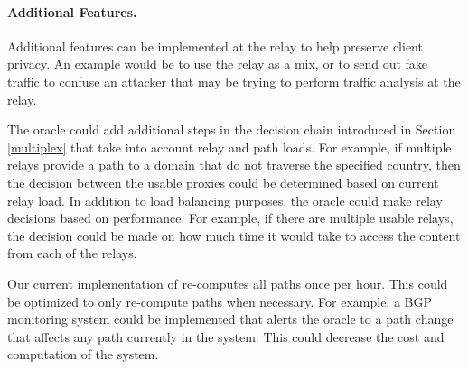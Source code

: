 \paragraph{Additional \system{} Features.}  Additional features can be 
implemented at the relay to help preserve client privacy.  An example would 
be to use the relay as a mix, or to send out fake traffic to confuse an 
attacker that may be trying to perform traffic analysis at the relay.

The oracle could add additional 
steps in the decision chain introduced in Section \ref{multiplex} that take 
into account relay and path loads.  For example, if multiple relays provide 
a path to a domain that do not traverse the specified country, then the 
decision between the usable proxies could be determined based on current relay 
load.  In addition to load balancing purposes, the oracle 
could make relay decisions based on performance.  For example, if there are 
multiple usable relays, the decision could be made on how much time it would 
take to access the content from each of the relays.

Our current implementation of \system{} 
re-computes all paths once per hour.  This could be optimized to only re-compute 
paths when necessary.  For example, a BGP monitoring system could be implemented 
that alerts the oracle to a path change that affects any path currently in 
the system.  This could decrease the cost and computation of the system.
